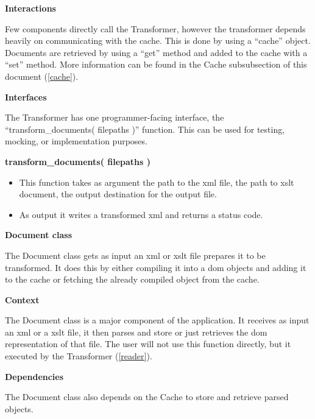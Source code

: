 \textbf{Interactions}

Few components directly call the Transformer, however the transformer depends heavily on communicating with the cache.
This is done by using a ``cache'' object.
Documents are retrieved by using a ``get'' method and added to the cache with a ``set'' method.
More information can be found in the Cache subsubsection of this document (\ref{cache}).

\textbf{Interfaces}

The Transformer has one programmer-facing interface, the ``transform\_documents( filepaths )'' function.
This can be used for testing, mocking, or implementation purposes.

\textbf{transform\_documents( filepaths )}

\begin{itemize}
  \item This function takes as argument the path to the \gls{xml} file, the path to \gls{xslt} document, the output destination for the output file.
  \item As output it writes a transformed \gls{xml} and returns a status code.
\end{itemize}

\textbf{Document class}
\label{document}
\label{parser}

The Document class gets as input an \gls{xml} or \gls{xslt} file prepares it to be transformed.
It does this by either compiling it into a \gls{dom} objects and adding it to the cache or fetching the already compiled object from the cache.

\textbf{Context}

The Document class is a major component of the application.
It receives as input an \gls{xml} or a \gls{xslt} file, it then parses and store or just retrieves the \gls{dom} representation of that file.
The user will not use this function directly, but it executed by the Transformer (\ref{reader}).

\textbf{Dependencies}

The Document class also depends on the Cache to store and retrieve parsed objects.

